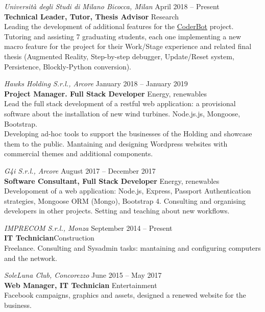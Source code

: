 \documentclass[11pt]{res} %
\begin{document}
\begin{resume}
{\sl Università degli Studi di Milano Bicocca, Milan} \hfill April 2018 -- Present \\
\textbf{Technical Leader, Tutor, Thesis Advisor}  \hfill Research \\
Leading the development of additional features for the \href{ttp://www.coderbot.org/}{CoderBot} project. Tutoring and assisting 7 graduating students, each one implementing a new macro feature for the project for their Work/Stage experience and related final thesis (Augmented Reality, Step-by-step debugger, Update/Reset system, Persistence, Blockly-Python conversion).

{\sl Hawks Holding S.r.l., Arcore} \hfill 
January 2018 -- January 2019 \\
\textbf{Project Manager. Full Stack Developer} \hfill Energy, renewables \\
Lead the full stack development of a restful web application: a provisional software about the installation of new wind turbines. Node.js.js, Mongoose, Bootstrap.\\
Developing ad-hoc tools to support the businesses of the Holding and showcase them to the public. Mantaining and designing Wordpress websites with commercial themes and additional components.

{\sl G4i S.r.l., Arcore} \hfill 
August 2017 -- December 2017\\
\textbf{Software Consultant, Full Stack Developer}   \hfill Energy, renewables  \\
Developoment of a web application: Node.js, Express, Passport Authentication strategies, Mongoose ORM (Mongo), Bootstrap 4. Consulting and organising developers in other projects. Setting and teaching about new workflows.

{\sl IMPRECOM S.r.l., Monza} \hfill 
September 2014 -- Present \\
\textbf{IT Technician}\hfill Construction \\
Freelance. Consulting and Sysadmin tasks: mantaining and configuring computers and the network.

{\sl SoleLuna Club, Concorezzo} \hfill 
June 2015 -- May 2017 \\
\textbf{Web Manager, IT Technician }\hfill Entertainment\\
Facebook campaigns, graphics and assets, designed a renewed website for the business.


\vspace{0.2in} %


\end{resume}
\end{document}
